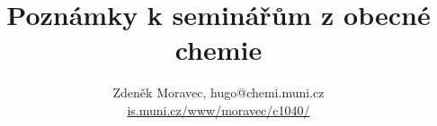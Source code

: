 \documentclass[17pt,a4paper,twoside]{extarticle}
\begin{document}
\title{Poznámky k seminářům z obecné chemie}
\author{Zdeněk Moravec, hugo@chemi.muni.cz \\
		\href{https://is.muni.cz/www/moravec/c1040/}{is.muni.cz/www/moravec/c1040/}}

\maketitle

\newpage
\setcounter{tocdepth}{2}
\tableofcontents


\newpage


\newpage


\newpage


\newpage


\newpage


\newpage


\newpage


\newpage
\end{document}
